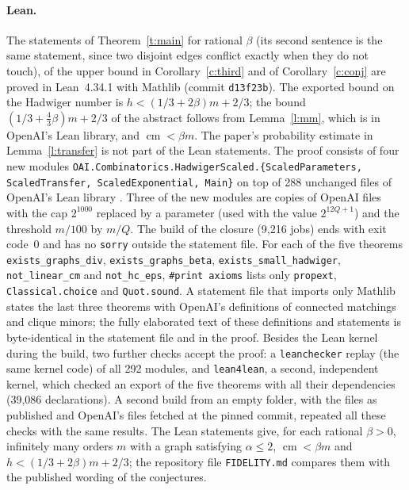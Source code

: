 \documentclass[11pt]{article}
\theoremstyle{definition}\newtheorem{conjecture}[theorem]{Conjecture}
\theoremstyle{remark}\newtheorem{remark}[theorem]{Remark}
\newcommand{\cm}{\operatorname{cm}}
\begin{document}
\paragraph{Lean.} The statements of Theorem~\ref{t:main} for rational $\beta$ (its second sentence is the same statement,
since two disjoint edges conflict exactly when they do not touch), of the upper bound in Corollary~\ref{c:third} and of
Corollary~\ref{c:conj} are proved in Lean~4.34.1 with Mathlib (commit \texttt{d13f23b}). The exported bound on the
Hadwiger number is $h<(1/3+2\beta)m+2/3$; the bound $(1/3+\tfrac43\beta)m+2/3$ of the abstract follows from
Lemma~\ref{l:mm}, which is in OpenAI's Lean library, and $\cm<\beta m$. The paper's probability estimate in
Lemma~\ref{l:transfer} is not part of the Lean statements. The
proof consists of four new modules \texttt{OAI.Combinatorics.HadwigerScaled.\{ScaledParameters, ScaledTransfer,
ScaledExponential, Main\}} on top of 288 unchanged files of OpenAI's Lean library \cite{OAIL}. Three of the new modules are
copies of OpenAI files with the cap $2^{1000}$ replaced by a parameter (used with the value $2^{12Q+1}$) and the threshold
$m/100$ by $m/Q$. The build of the
closure (9,216 jobs) ends with exit code~0 and has no \texttt{sorry} outside the statement file. For each of the five
theorems \texttt{exists\_graphs\_div}, \texttt{exists\_graphs\_beta}, \texttt{exists\_small\_hadwiger},
\texttt{not\_linear\_cm} and \texttt{not\_hc\_eps}, \texttt{\#print axioms} lists only \texttt{propext},
\texttt{Classical.choice} and \texttt{Quot.sound}. A statement file that imports only Mathlib states the last three theorems
with OpenAI's definitions of connected matchings and clique minors; the fully elaborated text of these definitions and
statements is byte-identical in the statement file and in the proof. Besides the Lean kernel during the build, two
further checks accept the proof: a \texttt{leanchecker} replay (the same kernel code) of all 292 modules, and
\texttt{lean4lean}, a second, independent kernel, which checked an export of the five theorems with all their dependencies
(39,086 declarations). A second build from an
empty folder, with the files as published and OpenAI's files fetched at the pinned commit, repeated all these checks with
the same results. The Lean statements give, for each rational $\beta>0$, infinitely many orders $m$ with a
graph satisfying $\alpha\le2$, $\cm<\beta m$ and $h<(1/3+2\beta)m+2/3$; the repository file \texttt{FIDELITY.md} compares them
with the published wording of the conjectures.
\end{document}
